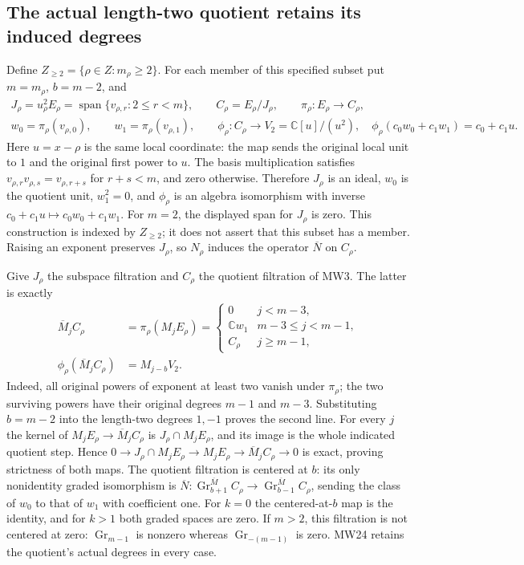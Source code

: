 \subsection{The actual length-two quotient retains its induced degrees}

Define \(Z_{\geq2}=\{\rho\in Z:m_\rho\geq2\}\). For each member
of this specified subset put \(m=m_\rho\), \(b=m-2\), and
\[
 \begin{gathered}
 J_\rho=u_\rho^2E_\rho
       =\operatorname{span}\{v_{\rho,r}:2\leq r<m\},\qquad
 C_\rho=E_\rho/J_\rho,\qquad
 \pi_\rho:E_\rho\longrightarrow C_\rho,\\
 w_0=\pi_\rho(v_{\rho,0}),\qquad
 w_1=\pi_\rho(v_{\rho,1}),\qquad
 \phi_\rho:C_\rho\longrightarrow V_2=\mathbb C[u]/(u^2),
 \quad \phi_\rho(c_0w_0+c_1w_1)=c_0+c_1u.
 \end{gathered}
 \tag{MW23}
\]
Here \(u=x-\rho\) is the same local coordinate: the map sends the
original local unit to \(1\) and the original first power to \(u\).
The basis multiplication satisfies
\(v_{\rho,r}v_{\rho,s}=v_{\rho,r+s}\) for \(r+s<m\), and zero
otherwise. Therefore \(J_\rho\) is an ideal, \(w_0\) is the quotient
unit, \(w_1^2=0\), and \(\phi_\rho\) is an algebra isomorphism with
inverse \(c_0+c_1u\mapsto c_0w_0+c_1w_1\).
For \(m=2\), the displayed span for \(J_\rho\) is zero. This
construction is indexed by \(Z_{\geq2}\); it does not assert that
this subset has a member. Raising an exponent preserves \(J_\rho\),
so \(N_\rho\) induces the operator \(\overline N\) on \(C_\rho\).

Give \(J_\rho\) the subspace filtration and \(C_\rho\) the quotient
filtration of MW3. The latter is exactly
\[
 \begin{aligned}
 \overline M_jC_\rho&=\pi_\rho(M_jE_\rho)
 =\begin{cases}
 0&j<m-3,\\
 \mathbb Cw_1&m-3\leq j<m-1,\\
 C_\rho&j\geq m-1,
 \end{cases}\\
 \phi_\rho(\overline M_jC_\rho)&=M_{j-b}V_2.
 \end{aligned}
 \tag{MW24}
\]
Indeed, all original powers of exponent at least two vanish under
\(\pi_\rho\); the two surviving powers have their original degrees
\(m-1\) and \(m-3\). Substituting \(b=m-2\) into the length-two
degrees \(1,-1\) proves the second line. For every \(j\) the kernel
of \(M_jE_\rho\to\overline M_jC_\rho\) is
\(J_\rho\cap M_jE_\rho\), and its image is the whole indicated
quotient step. Hence
\(0\to J_\rho\cap M_jE_\rho\to M_jE_\rho\to
\overline M_jC_\rho\to0\) is exact, proving strictness of both maps.
The quotient filtration is centered at \(b\): its only nonidentity
graded isomorphism is
\(\overline N:\operatorname{Gr}_{b+1}^{\overline M}C_\rho
\to\operatorname{Gr}_{b-1}^{\overline M}C_\rho\), sending the class
of \(w_0\) to that of \(w_1\) with coefficient one. For \(k=0\)
the centered-at-\(b\) map is the identity, and for \(k>1\) both
graded spaces are zero. If \(m>2\), this filtration is not centered
at zero: \(\operatorname{Gr}_{m-1}\) is nonzero whereas
\(\operatorname{Gr}_{-(m-1)}\) is zero. MW24 retains the quotient's
actual degrees in every case.

